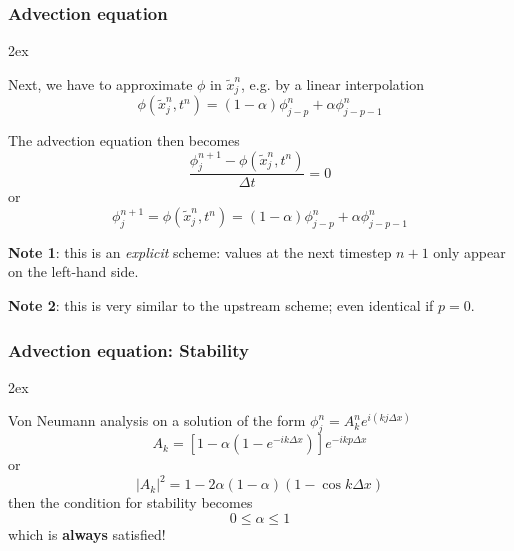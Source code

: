 \documentclass[aspectratio=149,9pt]{beamer}
\begin{document}
\begin{frame}
	\frametitle{Advection equation}
	\begin{myitemize}{2ex}
		\item Next, we have to approximate $\phi$ in $\tilde x_j^n$, e.g. by a linear interpolation
			\begin{equation*}
				\phi ( \tilde x_j^n, t^n) = (1-\alpha) \phi^n_{j-p} + \alpha \phi_{j-p-1}^n
			\end{equation*}
		\item The advection equation then becomes
			\begin{equation*}
				\frac{\phi^{n+1}_j-\phi(\tilde x_j^n,t^n)}{\Delta t} = 0
			\end{equation*}
			or
			\begin{equation*}
				\phi^{n+1}_j = \phi(\tilde x_j^n,t^n) = (1-\alpha) \phi^n_{j-p} + \alpha \phi_{j-p-1}^n
			\end{equation*}
	\pause
		\item \textbf{Note 1}: this is an \emph{explicit} scheme: values at the next timestep $n+1$ only appear on the left-hand side.
		\item \textbf{Note 2}: this is very similar to the upstream scheme; even identical if $p=0$.
	\end{myitemize}
\end{frame}
%
%
\begin{frame}
	\frametitle{Advection equation: Stability}
	\begin{myitemize}{2ex}
		\item Von Neumann analysis on a solution of the form $\phi_j^n = A_k^n e^{i(kj \Delta x)}$
			\begin{equation*}
				A_k = \left[ 1 - \alpha \left( 1 - e^{-i k \Delta x} \right) \right] e^{-i k p \Delta x}
			\end{equation*}
			or
			\begin{equation*}
				| A_k |^2 = 1 - 2 \alpha (1-\alpha) ( 1 -\cos k \Delta x )
			\end{equation*}
			then the condition for stability becomes
			\begin{equation*}
				0 \le \alpha \le 1
			\end{equation*}
			which is \textbf{always} satisfied!
	\end{myitemize}
\end{frame}
%
\end{document}
